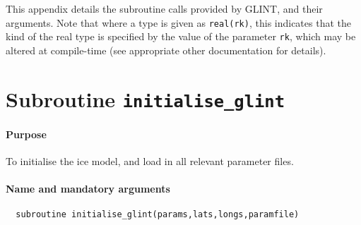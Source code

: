 %
This appendix details the subroutine calls provided by GLINT, and their
arguments. Note that where a type is given as \texttt{real(rk)}, this
indicates that the kind of the real type is specified by the value of
the parameter \texttt{rk}, which may be altered at compile-time (see appropriate
other documentation for details).
%
%
\section{Subroutine \texttt{initialise\_glint}}
%
\paragraph{Purpose} To initialise the ice model, and load in all relevant parameter files.
%
\paragraph{Name and mandatory arguments}
%
\begin{verbatim}
  subroutine initialise_glint(params,lats,longs,paramfile)
\end{verbatim}
%
